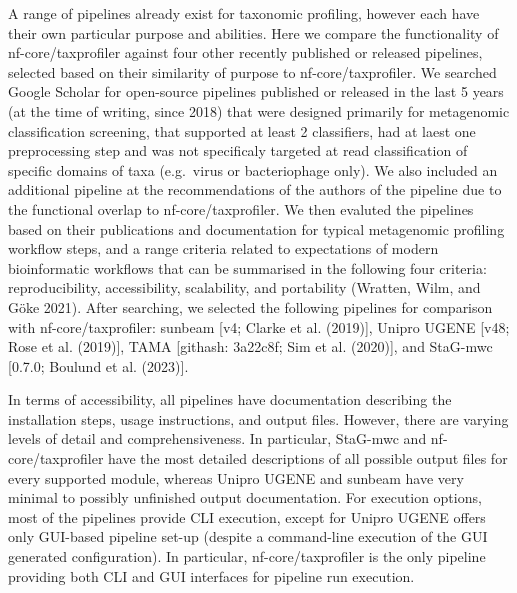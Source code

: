 \documentclass[
]{article}
\begin{document}
A range of pipelines already exist for taxonomic profiling, however each
have their own particular purpose and abilities. Here we compare the
functionality of nf-core/taxprofiler against four other recently
published or released pipelines, selected based on their similarity of
purpose to nf-core/taxprofiler. We searched Google Scholar for
open-source pipelines published or released in the last 5 years (at the
time of writing, since 2018) that were designed primarily for
metagenomic classification screening, that supported at least 2
classifiers, had at laest one preprocessing step and was not specificaly
targeted at read classification of specific domains of taxa (e.g.~virus
or bacteriophage only). We also included an additional pipeline at the
recommendations of the authors of the pipeline due to the functional
overlap to nf-core/taxprofiler. We then evaluted the pipelines based on
their publications and documentation for typical metagenomic profiling
workflow steps, and a range criteria related to expectations of modern
bioinformatic workflows that can be summarised in the following four
criteria: reproducibility, accessibility, scalability, and portability
(Wratten, Wilm, and Göke 2021). After searching, we selected the
following pipelines for comparison with nf-core/taxprofiler: sunbeam
{[}v4; Clarke et al. (2019){]}, Unipro UGENE {[}v48; Rose et al.
(2019){]}, TAMA {[}githash: 3a22c8f; Sim et al. (2020){]}, and StaG-mwc
{[}0.7.0; Boulund et al. (2023){]}.

In terms of accessibility, all pipelines have documentation describing
the installation steps, usage instructions, and output files. However,
there are varying levels of detail and comprehensiveness. In particular,
StaG-mwc and nf-core/taxprofiler have the most detailed descriptions of
all possible output files for every supported module, whereas Unipro
UGENE and sunbeam have very minimal to possibly unfinished output
documentation. For execution options, most of the pipelines provide CLI
execution, except for Unipro UGENE offers only GUI-based pipeline set-up
(despite a command-line execution of the GUI generated configuration).
In particular, nf-core/taxprofiler is the only pipeline providing both
CLI and GUI interfaces for pipeline run execution.
\end{document}
